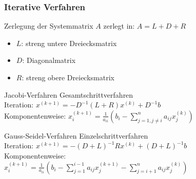 \columnbreak

\subsubsection{Iterative Verfahren}

\begin{definition}{Zerlegung der Systemmatrix} $A$ zerlegt in: $A = L + D + R$
    \small
\begin{itemize}
    \item $L$: streng untere Dreiecksmatrix
    \item $D$: Diagonalmatrix
    \item $R$: streng obere Dreiecksmatrix
\end{itemize}
\end{definition}

\begin{concept}{Jacobi-Verfahren}
Gesamtschrittverfahren 
\vspace{1mm}\\
Iteration: $x^{(k+1)} = -D^{-1}(L + R)x^{(k)} + D^{-1}b$
\vspace{1mm}\\
Komponentenweise:
$x_i^{(k+1)} = \frac{1}{a_{ii}}\left(b_i - \sum_{j=1,j\neq i}^n a_{ij}x_j^{(k)}\right)$
\end{concept}

\begin{concept}{Gauss-Seidel-Verfahren}
Einzelschrittverfahren 
\vspace{1mm}\\
Iteration: $x^{(k+1)} = -(D+L)^{-1}Rx^{(k)} + (D+L)^{-1}b$
\vspace{1mm}\\
Komponentenweise:\\
$x_i^{(k+1)} = \frac{1}{a_{ii}}\left(b_i - \sum_{j=1}^{i-1} a_{ij}x_j^{(k+1)} - \sum_{j=i+1}^n a_{ij}x_j^{(k)}\right)$
\end{concept}

